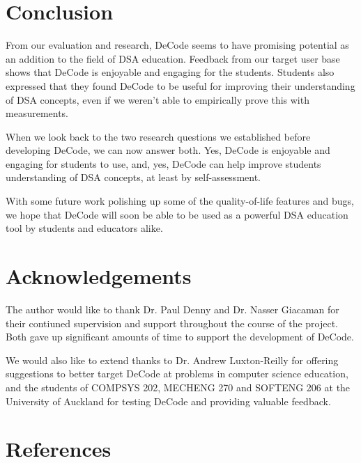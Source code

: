 \documentclass[11pt]{article}
\begin{document}
\section{Conclusion}
From our evaluation and research, DeCode seems to have promising potential as an addition to the field of DSA education. Feedback from our target user base shows that DeCode is enjoyable and engaging for the students. Students also expressed that they found DeCode to be useful for improving their understanding of DSA concepts, even if we weren't able to empirically prove this with measurements.\par
When we look back to the two research questions we established before developing DeCode, we can now answer both. Yes, DeCode is enjoyable and engaging for students to use, and, yes, DeCode can help improve students understanding of DSA concepts, at least by self-assessment.\par
With some future work polishing up some of the quality-of-life features and bugs, we hope that DeCode will soon be able to be used as a powerful DSA education tool by students and educators alike.
\section{Acknowledgements}
The author would like to thank Dr. Paul Denny and Dr. Nasser Giacaman for their contiuned supervision and support throughout the course of the project. Both gave up significant amounts of time to support the development of DeCode.\par
We would also like to extend thanks to Dr. Andrew Luxton-Reilly for offering suggestions to better target DeCode at problems in computer science education, and the students of COMPSYS 202, MECHENG 270 and SOFTENG 206 at the University of Auckland for testing DeCode and providing valuable feedback.
\begingroup

\section*{References}
  \vspace{2mm}

  \renewcommand{\section}[2]{}

  \begin{spacing}{1.0}

    
    \small
    

  \end{spacing}

\endgroup
\end{document}
